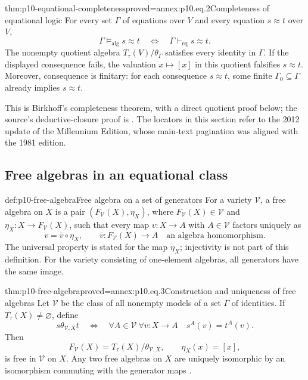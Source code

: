 \begin{hbtheorem}{thm:p10-equational-completeness}{proved=annex:p10.eq.2}{Completeness of equational logic}
For every set \(\Gamma\) of equations over \(V\) and every equation
\(s\approx t\) over \(V\),
\[
 \Gamma\models_{\mathrm{alg}}s\approx t
 \quad\Longleftrightarrow\quad
 \Gamma\vdash_{\mathrm{eq}}s\approx t.
\]
The nonempty quotient algebra \(T_\tau(V)/\theta_\Gamma\) satisfies
every identity in \(\Gamma\).
If the displayed consequence fails, the valuation \(x\mapsto[x]\)
in this quotient falsifies \(s\approx t\).
Moreover, consequence is finitary: for each consequence \(s\approx t\),
some finite \(\Gamma_0\subseteq\Gamma\) already implies \(s\approx t\).
\end{hbtheorem}

This is Birkhoff's completeness theorem, with a direct quotient proof
below; the source's deductive-closure proof is
\cite[II\S14, Theorem~14.19, p.~95]{BurrisSankappanavar2012}.
The locators in this section refer to the 2012 update of the
Millennium Edition, whose main-text pagination was aligned with the
1981 edition.

\subsection{Free algebras in an equational class}
\label{sec:p10-free-algebras}

\begin{hbdefinition}{def:p10-free-algebra}{Free algebra on a set of generators}
For a variety \(\mathcal V\), a free algebra on \(X\) is a pair
\((F_{\mathcal V}(X),\eta_X)\), where
\(F_{\mathcal V}(X)\in\mathcal V\) and
\(\eta_X:X\to F_{\mathcal V}(X)\), such that every map \(v:X\to A\)
with \(A\in\mathcal V\) factors uniquely as
\[
 v=\bar v\circ\eta_X,\qquad
 \bar v:F_{\mathcal V}(X)\longrightarrow A
 \quad\text{an algebra homomorphism}.
\]
The universal property is stated for the map \(\eta_X\);
injectivity is not part of this definition.
For the variety consisting of one-element algebras, all generators
have the same image.
\end{hbdefinition}

\begin{hbtheorem}{thm:p10-free-algebra}{proved=annex:p10.eq.3}{Construction and uniqueness of free algebras}
Let \(\mathcal V\) be the class of all nonempty models of a set
\(\Gamma\) of identities. If \(T_\tau(X)\ne\varnothing\), define
\[
 s\mathrel{\theta_{\mathcal V,X}}t
 \quad\Longleftrightarrow\quad
 \forall A\in\mathcal V\ \forall v:X\to A\quad
                    s^A(v)=t^A(v).
\]
Then
\[
 F_{\mathcal V}(X)=T_\tau(X)/\theta_{\mathcal V,X},
 \qquad \eta_X(x)=[x],
\]
is free in \(\mathcal V\) on \(X\).
Any two free algebras on \(X\) are uniquely isomorphic by an
isomorphism commuting with the generator maps
\cite[II\S10, Theorems~10.7, 10.10, 10.12;
II\S11, Theorem~11.4]{BurrisSankappanavar2012}.
\end{hbtheorem}

